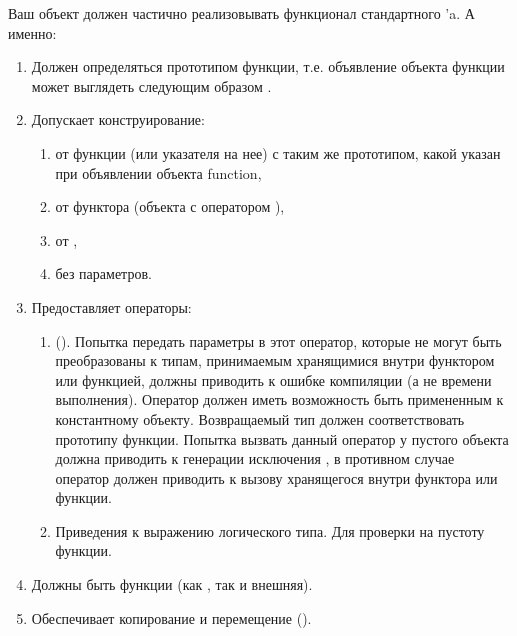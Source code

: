 \documentclass[a4paper,10pt]{article}
\begin{document}
Ваш объект  должен частично реализовывать функционал стандартного
’a. А именно:
\begin{enumerate}
    \item Должен определяться прототипом функции, т.е. объявление объекта функции может
        выглядеть следующим образом .
    \item Допускает конструирование:
    \begin{enumerate}
        \item от функции (или указателя на нее) с таким же прототипом, какой указан при
        объявлении объекта function,
        \item от функтора (объекта с оператором \cpp{()}),
        \item от ,
        \item без параметров.
    \end{enumerate}
    \item Предоставляет операторы:
    \begin{enumerate}
        \item (). Попытка передать параметры в этот оператор, которые не могут быть
преобразованы к типам, принимаемым хранящимися внутри функтором или
функцией, должны приводить к ошибке компиляции (а не времени выполнения).
Оператор должен иметь возможность быть примененным к константному объекту.
Возвращаемый тип должен соответствовать прототипу функции. Попытка вызвать
данный оператор у пустого объекта  должна приводить к генерации
исключения , в противном случае оператор должен приводить
к вызову хранящегося внутри функтора или функции.
        \item Приведения к выражению логического типа. Для проверки на пустоту функции.
    \end{enumerate}
    \item Должны быть функции  (как , так и внешняя).
    \item Обеспечивает копирование и перемещение ().
\end{enumerate}
\end{document}
